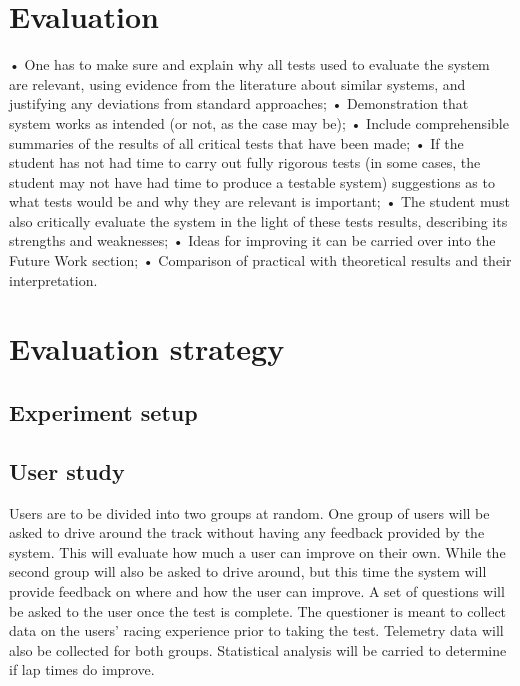 \section{Evaluation}

• One has to make sure and explain why all tests used to evaluate the system are relevant, using evidence from the literature about similar systems, and justifying any deviations from standard approaches;
• Demonstration that system works as intended (or not, as the case may be);
• Include comprehensible summaries of the results of all critical tests that have been made;
• If the student has not had time to carry out fully rigorous tests (in some cases, the student
may not have had time to produce a testable system) suggestions as to what tests would be and why they are relevant is important;
• The student must also critically evaluate the system in the light of these tests results, describing its strengths and weaknesses;
• Ideas for improving it can be carried over into the Future Work section;
• Comparison of practical with theoretical results and their interpretation. 

\section{Evaluation strategy}

\subsection{Experiment setup}

\subsection{User study}
Users are to be divided into two groups at random. One group of users will be asked to drive around the track without having any feedback provided by the system. This will evaluate how much a user can improve on their own. While the second group will also be asked to drive around, but this time the system will provide feedback on where and how the user can improve. A set of questions will be asked to the user once the test is complete. The questioner is meant to collect data on the users' racing experience prior to taking the test. Telemetry data will also be collected for both groups. Statistical analysis will be carried to determine if lap times do improve. 